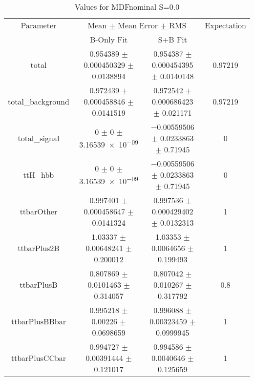 \begin{table}
\centering
\caption{Values for MDFnominal S=0.0}
\begin{tabular}{cccc}
\toprule
Parameter & \multicolumn{2}{c}{Mean $\pm$ Mean Error $\pm$ RMS} & Expectation\\
 & B-Only Fit & S+B Fit & \\
\midrule
total & \num{0.954389} $\pm$ \num{0.000450329} $\pm$ \num{0.0138894} & \num{0.954387} $\pm$ \num{0.000454395} $\pm$ \num{0.0140148} & \num{0.97219}\\
total\_background & \num{0.972439} $\pm$ \num{0.000458846} $\pm$ \num{0.0141519} & \num{0.972542} $\pm$ \num{0.000686423} $\pm$ \num{0.021171} & \num{0.97219}\\
total\_signal & \num{0} $\pm$ \num{0} $\pm$ \num{3.16539e-09} & \num{-0.00559506} $\pm$ \num{0.0233863} $\pm$ \num{0.71945} & \num{0}\\
ttH\_hbb & \num{0} $\pm$ \num{0} $\pm$ \num{3.16539e-09} & \num{-0.00559506} $\pm$ \num{0.0233863} $\pm$ \num{0.71945} & \num{0}\\
ttbarOther & \num{0.997401} $\pm$ \num{0.000458647} $\pm$ \num{0.0141324} & \num{0.997536} $\pm$ \num{0.000429402} $\pm$ \num{0.0132313} & \num{1}\\
ttbarPlus2B & \num{1.03337} $\pm$ \num{0.00648241} $\pm$ \num{0.200012} & \num{1.03353} $\pm$ \num{0.0064656} $\pm$ \num{0.199493} & \num{1}\\
ttbarPlusB & \num{0.807869} $\pm$ \num{0.0101463} $\pm$ \num{0.314057} & \num{0.807042} $\pm$ \num{0.010267} $\pm$ \num{0.317792} & \num{0.8}\\
ttbarPlusBBbar & \num{0.995218} $\pm$ \num{0.00226} $\pm$ \num{0.0698659} & \num{0.996088} $\pm$ \num{0.00323459} $\pm$ \num{0.0999945} & \num{1}\\
ttbarPlusCCbar & \num{0.994727} $\pm$ \num{0.00391444} $\pm$ \num{0.121017} & \num{0.994586} $\pm$ \num{0.0040646} $\pm$ \num{0.125659} & \num{1}\\
\bottomrule
\end{tabular}
\end{table}